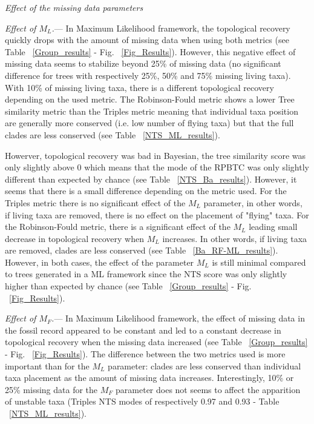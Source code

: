 \documentclass[12pt,letterpaper]{article}
\renewcommand{\subsection}[1]{%
\bigskip
\begin{center}
\begin{large}
\normalfont\itshape #1
\end{large}
\end{center}}
\renewcommand{\subsubsection}[1]{%
\vspace{2ex}
\noindent
\textit{#1.}---}
\begin{document}
\subsection{Effect of the missing data parameters}


\subsubsection{Effect of $M_L$}
In Maximum Likelihood framework, the topological recovery quickly drops with the amount of missing data when using both metrics (see Table ~\ref{Group_results} - Fig. ~\ref{Fig_Results}).
However, this negative effect of missing data seems to stabilize beyond 25\% of missing data (no significant difference for trees with respectively 25\%, 50\% and 75\% missing living taxa).
With 10\% of missing living taxa, there is a different topological recovery depending on the used metric.
The Robinson-Fould metric shows a lower Tree similarity metric than the Triples metric meaning that individual taxa position are generally more conserved (i.e. low number of flying taxa) but that the full clades are less conserved (see Table ~\ref{NTS_ML_results}).

Howerver, topological recovery was bad in Bayesian, the tree similarity score was only slightly above 0 which means that the mode of the RPBTC was only slightly different than expected by chance (see Table ~\ref{NTS_Ba_results}).
However, it seems that there is a small difference depending on the metric used.
For the Triples metric there is no significant effect of the $M_L$ parameter, in other words, if living taxa are removed, there is no effect on the placement of "flying" taxa.
For the Robinson-Fould metric, there is a significant effect of the $M_L$ leading small decrease in topological recovery when $M_L$ increases.
In other words, if living taxa are removed, clades are less conserved (see Table ~\ref{Ba_RF-ML_results}).
However, in both cases, the effect of the parameter $M_L$ is still minimal compared to trees generated in a ML framework since the NTS score was only slightly higher than expected by chance (see Table ~\ref{Group_results} - Fig. ~\ref{Fig_Results}).

\subsubsection{Effect of $M_F$}
In Maximum Likelihood framework, the effect of missing data in the fossil record appeared to be constant and led to a constant decrease in topological recovery when the missing data increased (see Table ~\ref{Group_results} - Fig. ~\ref{Fig_Results}).
The difference between the two metrics used is more important than for the $M_L$ parameter: clades are less conserved than individual taxa placement as the amount of missing data increases.
Interestingly, 10\% or 25\% missing data for the $M_F$ parameter does not seems to affect the apparition of unstable taxa (Triples NTS modes of respectively 0.97 and 0.93 - Table ~\ref{NTS_ML_results}).
\end{document}
